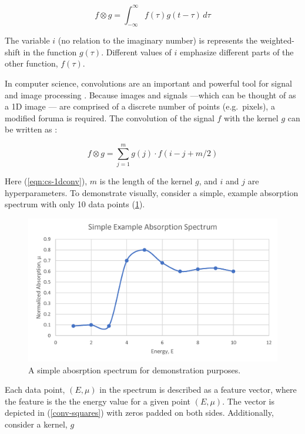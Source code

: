 \begin{equation}
    f \otimes g = \int_{-\infty}^{\infty} f(\tau)g(t-\tau) \,d\tau 
\end{equation}

\noindent The variable $ i $ (no relation to the imaginary number) is represents the weighted-shift in the function $ g(\tau) $. Different values of $ i $ emphasize different parts of the other function, $ f(\tau) $.  

In computer science, convolutions are an important and powerful tool for signal and image processing \cite{1dconv-NN-survey} \cite{deepCNNforImages}. Because images and signals ---which can be thought of as a 1D image --- are comprised of a discrete number of points (e.g.~pixels), a modified foruma is required. The convolution of the signal $ f $ with the kernel $ g $ can be written as \cite{cornell-convs}:

\begin{equation}
    \label{eqn:cs-1dconv}
    f \otimes g = \sum_{j=1}^m g(j) \cdot  f(i-j+m/2)
\end{equation}

\noindent Here (\ref{eqn:cs-1dconv}), $ m $ is the length of the kernel $ g $, and $ i $ and $ j $ are hyperparameters. To demonstrate visually, consider a simple, example absorption spectrum with only 10 data points (\ref{fig:conv-ex-spectrum}).

\begin{figure}[h!]
    \centering
    \includegraphics[width=.75\linewidth]{Chapters/Figures/conv-example.png}
    \caption[Toy Absorption Spectrum]{A simple abosrption spectrum for demonstration purposes.}
    \label{fig:conv-ex-spectrum}
\end{figure}
 
\noindent Each data point, $ (E, \mu) $ in the spectrum is described as a feature vector, where the feature is the the energy value for a given point $ (E, \mu) $. The vector is depicted in (\ref{conv-squares}) with zeros padded on both sides. Additionally, consider a kernel, $ g $  

